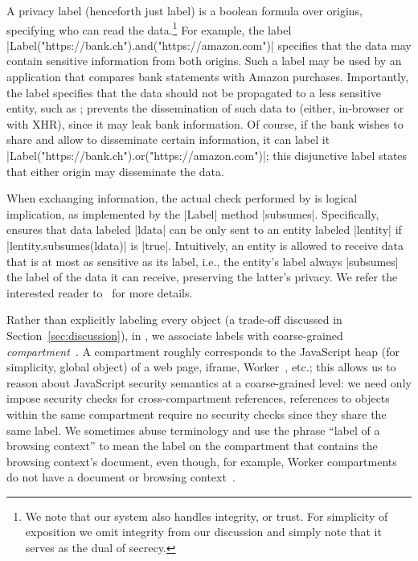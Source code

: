 A privacy label (henceforth just label) is a boolean formula over
origins, specifying who can read the data.\footnote{
  We note that our system also handles integrity, or trust.
  For simplicity of exposition we omit integrity from our discussion
  and simply note that it serves as the dual of secrecy.

}
%
For example, the label \js|Label("https://bank.ch").and("https://amazon.com")|
specifies that the data may contain sensitive information from both
origins.
%
Such a label may be used by an application that compares bank
statements with Amazon purchases.
%
Importantly, the label specifies that the data should not be
propagated to a less sensitive entity, such as ;
\sys{} prevents the dissemination of such data to 
(either, in-browser or with XHR), since it may leak bank information.
%
Of course, if the bank wishes to share and allow  to
disseminate certain information, it can label it
\js|Label("https://bank.ch").or("https://amazon.com")|;
this disjunctive label states that either origin may disseminate the
data.

When exchanging information, the actual check performed by \sys{} is
logical implication, as implemented by the \js|Label| method
\js|subsumes|.
%
Specifically, \sys{} ensures that data labeled \js|ldata| can be only sent
to an entity labeled \js|lentity| if
\js|lentity.subsumes(ldata)| is \js|true|.
%
Intuitively, an entity is allowed to receive data that is at most as
sensitive as its label, i.e., the entity's label always \js|subsumes|
the label of the data it can receive, preserving the latter's privacy.
%
We refer the interested reader to~\cite{stefan:2011:dclabels} for more
details.

Rather than explicitly labeling every object (a trade-off discussed in
Section~\ref{sec:discussion}), in \sys, we associate labels
with coarse-grained \emph{compartment}~\cite{wagner2011compartmental}.
%
A compartment roughly corresponds to the JavaScript heap (for
simplicity, global object) of a web page, iframe, Worker~\cite{workers},
etc.; this allows us to reason about JavaScript security semantics at
a coarse-grained level: we need only impose security checks for
cross-compartment references, references to objects within the same
compartment require no security checks since they share the same
label.
%
We sometimes abuse terminology and use the phrase  ``label of a
browsing context'' to mean the label on the compartment that contains
the browsing context's document, even though, for example, Worker
compartments do not have a document or browsing
context~\cite{workers}.
%
 
